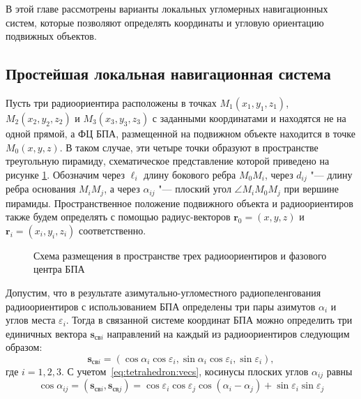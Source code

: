\documentclass[../main.tex]{subfiles}
\begin{document}
\renewcommand{\figurename}{Рисунок}

В этой главе рассмотрены варианты локальных угломерных навигационных систем, которые позволяют определять координаты и угловую ориентацию подвижных объектов.

%
%
%
\subsection{Простейшая локальная навигационная система}\label{sec:lunx_simple}
Пусть три радиоориентира расположены в точках $M_1\left(x_1, y_1, z_1\right)$, $M_2\left(x_2, y_2, z_2\right)$ и $M_3\left(x_3, y_3, z_3\right)$ с заданными координатами и находятся не на одной прямой, а ФЦ БПА, размещенной на подвижном объекте находится в точке $M_0\left(x, y, z\right)$. В таком случае, эти четыре точки образуют в пространстве треугольную пирамиду, схематическое представление которой приведено на рисунке \ref{fig:tetrahedron:pic1}. Обозначим через $\ell_i$ длину бокового ребра $M_0M_i$, через $d_{ij}$ "--- длину ребра основания $M_iM_j$, а через $\alpha_{ij}$ "--- плоский угол $\angle M_iM_0M_j$ при вершине пирамиды. Пространственное положение подвижного объекта и радиоориентиров также будем определять с помощью радиус-векторов $\mathbf{r}_0 = \left(x, y, z\right)$ и $\mathbf{r}_i = \left(x_i, y_i, z_i\right)$ соответственно.

\begin{figure}[htbp]
    \centering


    \caption{Схема размещения в пространстве трех радиоориентиров и фазового центра БПА}
    \label{fig:tetrahedron:pic1}
\end{figure}

Допустим, что в результате азимутально-угломестного радиопеленгования радиоориентиров с использованием БПА определены три пары азимутов $\alpha_{i}$ и углов места $\varepsilon_{i}$. Тогда в связанной системе координат БПА можно определить три единичных вектора $\mathbf{s}_{\text{св}i}$ направлений на каждый из радиоориентиров следующим образом:
\begin{equation}\label{eq:tetrahedron:vecs}
    \mathbf{s}_{\text{св}i} = \left(\cos\alpha_i \cos\varepsilon_i, \sin\alpha_i\cos\varepsilon_i, \sin\varepsilon_i\right),
\end{equation}
где $i = 1,2,3$. С учетом~\eqref{eq:tetrahedron:vecs}, косинусы плоских углов $\alpha_{ij}$ равны
\begin{equation}
    \cos\alpha_{ij} = \left(\mathbf{s}_{\text{св}i}, \mathbf{s}_{\text{св}j}\right) =
    \cos\varepsilon_i \cos\varepsilon_j \cos\left(\alpha_i - \alpha_j\right) + \sin\varepsilon_i \sin\varepsilon_j
\end{equation}
\end{document}

